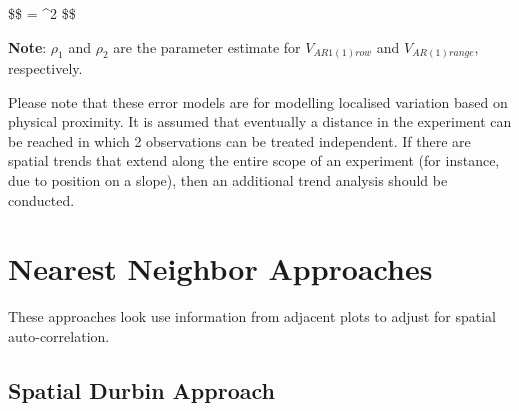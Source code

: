 \documentclass[]{book}
\begin{document}
\$\$  = \sigma\^{}2
\$\$

\textbf{Note}: \(\rho_1\) and \(\rho_2\) are the parameter estimate for \(V_{AR1(1) row}\) and \(V_{AR(1)range}\), respectively.

Please note that these error models are for modelling localised variation based on physical proximity. It is assumed that eventually a distance in the experiment can be reached in which 2 observations can be treated independent.
If there are spatial trends that extend along the entire scope of an experiment (for instance, due to position on a slope), then an additional trend analysis should be conducted.

\hypertarget{nearest-neighbor-approaches}{%
\section{Nearest Neighbor Approaches}\label{nearest-neighbor-approaches}}

These approaches look use information from adjacent plots to adjust for spatial auto-correlation.

\hypertarget{spatial-durbin-approach}{%
\subsection{Spatial Durbin Approach}\label{spatial-durbin-approach}}
\end{document}
